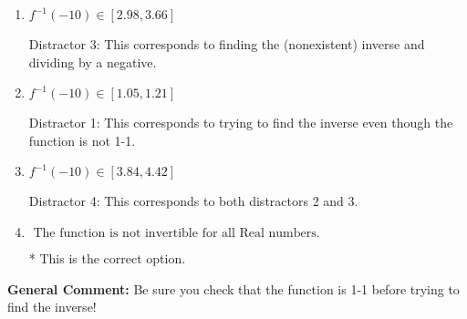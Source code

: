 \documentclass{extbook}[14pt]
\begin{document}
\begin{enumerate}
{\begin{enumerate}[label=\Alph*.]
 Distractor 2: This corresponds to finding the (nonexistent) inverse and not subtracting by the vertical shift.
\item \( f^{-1}(-10) \in [2.98, 3.66] \)

 Distractor 3: This corresponds to finding the (nonexistent) inverse and dividing by a negative.
\item \( f^{-1}(-10) \in [1.05, 1.21] \)

 Distractor 1: This corresponds to trying to find the inverse even though the function is not 1-1. 
\item \( f^{-1}(-10) \in [3.84, 4.42] \)

 Distractor 4: This corresponds to both distractors 2 and 3.
\item \( \text{ The function is not invertible for all Real numbers. } \)

* This is the correct option.
\end{enumerate}

\textbf{General Comment:} Be sure you check that the function is 1-1 before trying to find the inverse!
}
\end{enumerate}
\end{document}
